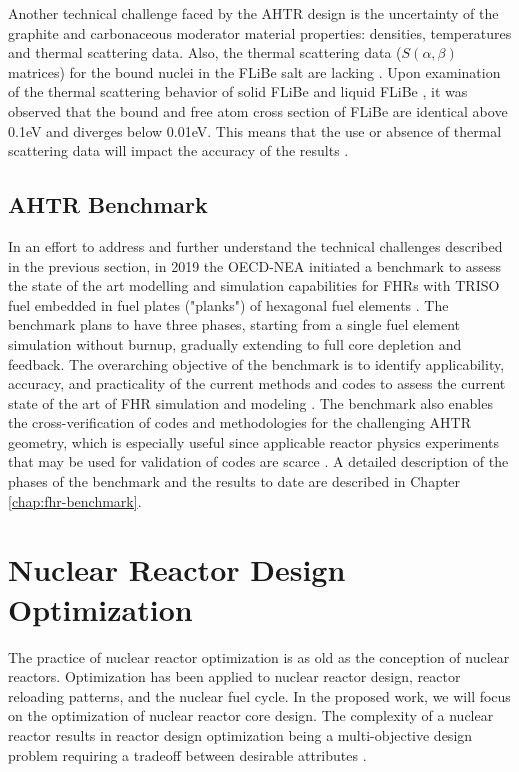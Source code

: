 Another technical challenge faced by the \gls{AHTR} design is the uncertainty of 
the graphite and carbonaceous moderator material properties: densities, temperatures
and thermal scattering data.
Also, the thermal scattering data ($S(\alpha,\beta)$ matrices) for the bound 
nuclei in the \gls{FLiBe} salt are lacking \cite{ramey_monte_2018}. 
Upon examination of the thermal scattering behavior of solid \gls{FLiBe}
\cite{mei_investigation_2013} and liquid \gls{FLiBe} \cite{zhu_thermal_2017}, 
it was observed that the bound and free atom cross section of \gls{FLiBe} are 
identical above 0.1eV and diverges below 0.01eV. 
This means that the use or absence of thermal scattering data will impact the 
accuracy of the results \cite{ramey_monte_2018}. 

\subsection{AHTR Benchmark}
In an effort to address and further understand the technical challenges described 
in the previous section, in 2019 the OECD-NEA initiated a benchmark to assess the 
state of the art modelling and simulation capabilities for \glspl{FHR} with 
\gls{TRISO} fuel embedded in fuel plates ("planks") of hexagonal fuel elements
\cite{noauthor_fluoride_nodate}. 
The benchmark plans to have three phases, starting from a single fuel element 
simulation without burnup, gradually extending to full core depletion and feedback. 
The overarching objective of the benchmark is to identify applicability, accuracy, 
and practicality of the current methods and codes to assess the current state 
of the art of \gls{FHR} simulation and modeling \cite{petrovic_preliminary_2021}. 
The benchmark also enables the cross-verification of codes and methodologies for the 
challenging \gls{AHTR} geometry, which is especially useful since applicable reactor 
physics experiments that may be used for validation of codes are scarce  
 \cite{petrovic_fhrahtr_2019,petrovic_preliminary_2021}. 
A detailed description of the phases of the benchmark and the results to date 
are described in Chapter \ref{chap:fhr-benchmark}. 

\section{Nuclear Reactor Design Optimization}
The practice of nuclear reactor optimization is as old as the conception of 
nuclear reactors. 
Optimization has been applied to nuclear reactor design, reactor reloading 
patterns, and the nuclear fuel cycle.  
In the proposed work, we will focus on the optimization of nuclear reactor 
core design. 
The complexity of a nuclear reactor results in reactor design optimization 
being a multi-objective design problem requiring a tradeoff between desirable 
attributes \cite{byrne_evolving_2014,simon_sciences_2019}. 

